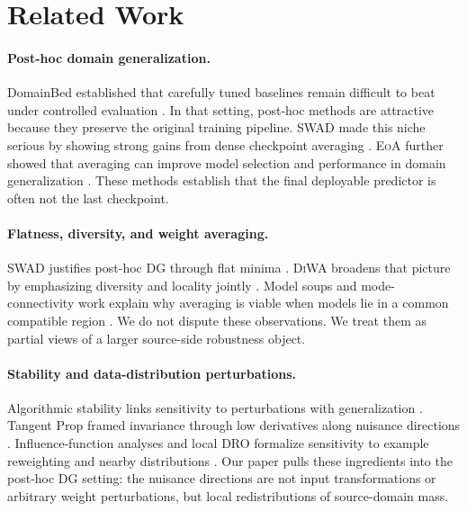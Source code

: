 \documentclass{article}
\theoremstyle{definition}
\newcommand{\swad}{\textup{\textsc{SWAD}}}
\newcommand{\diwa}{\textup{\textsc{DiWA}}}
\newcommand{\eoa}{\textup{\textsc{EoA}}}
\begin{document}
\section{Related Work}

\paragraph{Post-hoc domain generalization.}
DomainBed established that carefully tuned baselines remain difficult to beat under controlled evaluation \citep{gulrajani2021domainbed}. In that setting, post-hoc methods are attractive because they preserve the original training pipeline. \swad{} made this niche serious by showing strong gains from dense checkpoint averaging \citep{cha2021swad}. \eoa{} further showed that averaging can improve model selection and performance in domain generalization \citep{arpit2021ensemble}. These methods establish that the final deployable predictor is often not the last checkpoint.

\paragraph{Flatness, diversity, and weight averaging.}
\swad{} justifies post-hoc DG through flat minima \citep{cha2021swad}. \diwa{} broadens that picture by emphasizing diversity and locality jointly \citep{rame2022diwa}. Model soups and mode-connectivity work explain why averaging is viable when models lie in a common compatible region \citep{garipov2018fge,frankle2020linear,wortsman2022soups}. We do not dispute these observations. We treat them as partial views of a larger source-side robustness object.

\paragraph{Stability and data-distribution perturbations.}
Algorithmic stability links sensitivity to perturbations with generalization \citep{bousquet2002stability,hardt2016sgd}. Tangent Prop framed invariance through low derivatives along nuisance directions \citep{simard1991tangent}. Influence-function analyses and local DRO formalize sensitivity to example reweighting and nearby distributions \citep{koh2017influence,duchi2020variance,duchi2021learning}. Our paper pulls these ingredients into the post-hoc DG setting: the nuisance directions are not input transformations or arbitrary weight perturbations, but local redistributions of source-domain mass.
\end{document}
